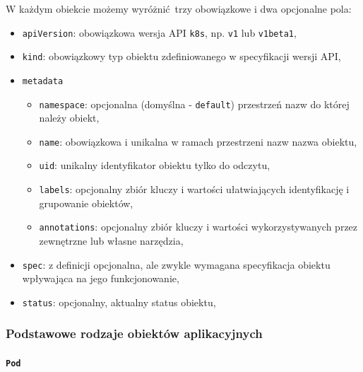 \documentclass[a4paper,12pt,twoside,openany]{report}
\providecommand{\tightlist}{%
  \setlength{\itemsep}{0pt}\setlength{\parskip}{0pt}}
\newcommand{\passthrough}[1]{#1}
\begin{document}
W każdym obiekcie możemy wyróżnić~trzy obowiązkowe i dwa opcjonalne
pola:

\begin{itemize}
\tightlist
\item
  \passthrough{\lstinline!apiVersion!}: obowiązkowa wersja API
  \passthrough{\lstinline!k8s!}, np. \passthrough{\lstinline!v1!} lub
  \passthrough{\lstinline!v1beta1!},
\item
  \passthrough{\lstinline!kind!}: obowiązkowy typ obiektu zdefiniowanego
  w specyfikacji wersji API,
\item
  \passthrough{\lstinline!metadata!}

  \begin{itemize}
  \tightlist
  \item
    \passthrough{\lstinline!namespace!}: opcjonalna (domyślna -
    \passthrough{\lstinline!default!}) przestrzeń nazw do której należy
    obiekt,
  \item
    \passthrough{\lstinline!name!}: obowiązkowa i unikalna w ramach
    przestrzeni nazw nazwa obiektu,
  \item
    \passthrough{\lstinline!uid!}: unikalny identyfikator obiektu tylko
    do odczytu,
  \item
    \passthrough{\lstinline!labels!}: opcjonalny zbiór kluczy i wartości
    ułatwiających identyfikację i grupowanie obiektów,
  \item
    \passthrough{\lstinline!annotations!}: opcjonalny zbiór kluczy i
    wartości wykorzystywanych przez zewnętrzne lub własne narzędzia,\\
  \end{itemize}
\item
  \passthrough{\lstinline!spec!}: z definicji opcjonalna, ale zwykle
  wymagana specyfikacja obiektu wpływająca na jego funkcjonowanie,
\item
  \passthrough{\lstinline!status!}: opcjonalny, aktualny status obiektu,
\end{itemize}

\hypertarget{podstawowe-rodzaje-obiektuxf3w-aplikacyjnych}{%
\subsubsection{Podstawowe rodzaje obiektów
aplikacyjnych}\label{podstawowe-rodzaje-obiektuxf3w-aplikacyjnych}}

\hypertarget{pod-1}{%
\paragraph{\texorpdfstring{\texttt{Pod}}{Pod}}\label{pod-1}}
\end{document}
